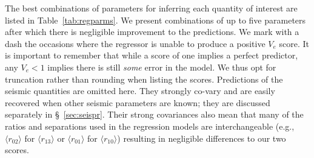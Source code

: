 The best combinations of parameters for inferring each quantity of interest are listed in Table~\ref{tab:regparms}. 
We present combinations of up to five parameters after which there is negligible improvement to the predictions. 
We mark with a dash the occasions where the regressor is unable to produce a positive $V_e$ score.  
It is important to remember that while a score of one implies a perfect predictor, any $V_e < 1$ implies there is still \emph{some} error in the model.  We thus opt for truncation rather than rounding when listing the scores. 
Predictions of the seismic quantities are omitted here.  They strongly co-vary and are easily recovered when other seismic parameters are known; they are discussed separately in  \S~\ref{sec:seispr}. 
Their strong covariances also mean that many of the ratios and separations used in the regression models are interchangeable (e.g., $\langle r_{02}\rangle$ for 
$\langle r_{13}\rangle$ or $\langle r_{01}\rangle$ for $\langle r_{10}\rangle$) resulting in negligible differences to our two scores. 

